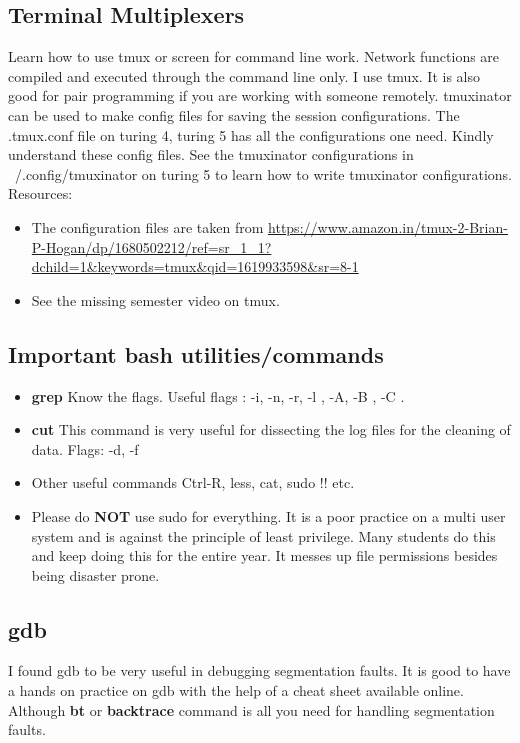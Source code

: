 \documentclass{article}
\begin{document}
\subsection{Terminal Multiplexers}
Learn how to use tmux or screen for command line work. Network functions are compiled and executed through the command line only.
I use tmux. It is also good for pair programming if you are working with someone remotely. tmuxinator can be used to make config files for saving the session configurations. The .tmux.conf file on turing 4, turing 5 has all the configurations one need. Kindly understand these config files. See the tmuxinator configurations in ~/.config/tmuxinator on turing 5 to learn how to write tmuxinator configurations.
Resources:
\begin{itemize}
    \item The configuration files are taken from \url{https://www.amazon.in/tmux-2-Brian-P-Hogan/dp/1680502212/ref=sr_1_1?dchild=1&keywords=tmux&qid=1619933598&sr=8-1}
    \item See the missing semester video on tmux.
\end{itemize}
\subsection{Important bash utilities/commands}
\begin{itemize}
    \item \textbf{grep} Know the flags. Useful flags : -i, -n, -r, -l , -A, -B , -C .
    \item \textbf{cut} This command is very useful for dissecting the log files for the cleaning of data. Flags: -d, -f 
    \item{Other useful commands} Ctrl-R, less, cat, sudo !! etc.
    \item Please do \textbf{NOT} use sudo for everything. It is a poor practice on a multi user system and is against the principle of least privilege. Many students do this and keep doing this for the entire year. It messes up file permissions besides being disaster prone. 
\end{itemize}
\subsection{gdb}
I found gdb to be very useful in debugging segmentation faults. It is good to have a hands on practice on gdb with the help of a cheat sheet available online. Although \textbf{bt} or \textbf{backtrace} command is all you need for handling segmentation faults.
\end{document}
